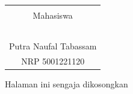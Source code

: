 \begin{center}
\begin{tabular}{c}
	\\
	\\
	Mahasiswa\\
	\\
	\\
	\\
	\\
	\\
	Putra Naufal Tabassam \\
	NRP 5001221120\\
\end{tabular}
\end{center}

\newpage
\thispagestyle{empty}
\vspace*{\fill}
    \begin{center}
	Halaman ini sengaja dikosongkan
    \end{center}
\vspace*{\fill}
\pagebreak
